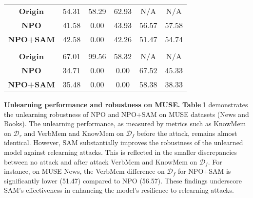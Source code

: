 \begin{table}[htb]
\begin{center}
{\begin{tabular}{c|c|cc|cc}
\textbf{Origin} & 54.31 & 58.29 & 62.93 & N/A & N/A  \\
\textbf{NPO} & 41.58 & 0.00  & 43.93 & 56.57 & 57.58 \\
\textbf{NPO+SAM} & 42.58 & 0.00  & 42.26 & 51.47 & 54.74 \\

\midrule
\rowcolor{Gray}
\multicolumn{6}{c}{\textbf{MUSE Books}} \\\midrule

\textbf{Origin} & 67.01 & 99.56 & 58.32 & N/A & N/A   \\
\textbf{NPO} & 34.71 & 0.00  & 0.00  & 67.52 & 45.33 \\
\textbf{NPO+SAM} & 35.48 & 0.00  & 0.00  & 58.38 & 38.33\\

\midrule
\bottomrule
\end{tabular}
}
\label{tab: relearn_muse}
\end{center}
\end{table}

\textbf{Unlearning performance and robustness on MUSE.} \textbf{Table\,\ref{tab: relearn_muse}} demonstrates the unlearning robustness of NPO and NPO+SAM on MUSE datasets (News and Books). The unlearning performance, as measured by metrics such as KnowMem on $\mathcal{D}_r$ and VerbMem and KnowMem on $\mathcal{D}_f$ before the attack, remains almost identical. However, SAM substantially improves the robustness of the unlearned model against relearning attacks. This is reflected in the smaller discrepancies between no attack and after attack VerbMem and KnowMem on $\mathcal{D}_f$. For instance, on MUSE News, the VerbMem difference on $\mathcal{D}_f$ for NPO+SAM is significantly lower (51.47) compared to NPO (56.57). These findings underscore SAM’s effectiveness in enhancing the model’s resilience to relearning attacks.



